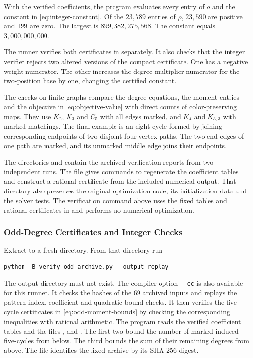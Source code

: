 With the verified coefficients, the program evaluates every entry of
$\rho$ and the constant in \eqref{eq:integer-constant}. Of the
$23{,}789$ entries of $\rho$, $23{,}590$ are positive and $199$ are
zero. The largest is $899{,}382{,}275{,}568$. The constant equals
$3{,}000{,}000{,}000$.

The runner verifies both certificates in  separately.
It also checks that the integer verifier rejects two altered versions
of the compact certificate. One has a negative weight numerator.
The other increases the degree multiplier numerator for the
two-position base by one, changing the certified constant.

The checks on finite graphs compare the degree equations, the moment
entries and the objective in \eqref{eq:objective-value} with direct
counts of color-preserving maps. They use $K_2$, $K_3$ and $C_5$ with
all edges marked, and $K_4$ and $K_{3,3}$ with marked matchings.
The final example is an eight-cycle formed by joining corresponding
endpoints of two disjoint four-vertex paths. The two end edges of one
path are marked, and its unmarked middle edge joins their endpoints.

The directories  and
 contain the archived verification reports from two independent runs. The file
 gives commands to regenerate the
coefficient tables and construct a rational certificate from the
included numerical output. That directory also preserves the
original optimization code, its initialization data and the solver
tests. The verification command above uses the fixed tables and
rational certificates in  and performs no numerical
optimization.

\subsubsection{Odd-Degree Certificates and Integer Checks}

Extract 
to a fresh directory. From that directory run
\begin{verbatim}
python -B verify_odd_archive.py --output replay
\end{verbatim}
The output directory must not exist. The compiler option \verb|--cc|
is also available for this runner. It checks the hashes of the 69
archived inputs and replays the pattern-index, coefficient and
quadratic-bound checks. It then verifies the five-cycle certificates in
\eqref{eq:odd-moment-bounds} by checking the corresponding inequalities
with rational arithmetic. The program  reads
the verified coefficient tables and the files
,
 and
. The first two bound the
number of marked induced five-cycles from below. The third bounds the
sum of their remaining degrees from above. The file
 identifies the fixed archive by its
SHA-256 digest.

